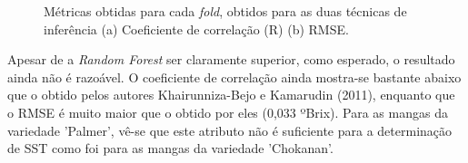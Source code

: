 \begin{figure}[H]
\centering
	\caption{Métricas obtidas para cada \textit{fold}, obtidos para as duas técnicas de inferência (a) Coeficiente de correlação (R) (b) RMSE.}
	\label{fig:fold_sst_hue}
\end{figure}

Apesar de a \textit{Random Forest} ser claramente superior, como esperado, o resultado ainda não é razoável. O coeficiente de correlação ainda mostra-se bastante abaixo que o obtido pelos autores Khairunniza-Bejo e Kamarudin (2011), enquanto que o RMSE é muito maior que o obtido por eles (0,033 ºBrix). Para as mangas da variedade 'Palmer', vê-se que este atributo não é suficiente para a determinação de SST como foi para as mangas da variedade 'Chokanan'.

